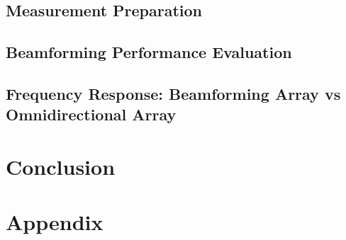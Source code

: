	\chapter{Measurement Preparation}
		 
		
	\chapter{Beamforming Performance Evaluation}
		
		
		
	\chapter{Frequency Response: Beamforming Array vs Omnidirectional Array}
		
		


 
\part{Conclusion}\label{pt:conclusion}
 


\glsresetall
\appendix %

 \graphicspath{{figures/appendix/}}
\part{Appendix}\label{pt:appendix}










%



